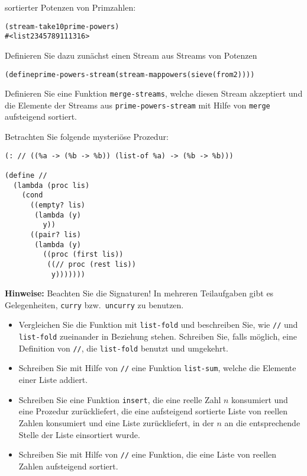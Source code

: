 \begin{aufgabe}
\begin{enumerate}
     sortierter Potenzen von Primzahlen:
     \begin{alltt}
(stream-take 10 prime-powers)
\evalsto{} #<list 2 3 4 5 7 8 9 11 13 16>
     \end{alltt}
     Definieren Sie dazu zunächst einen Stream aus Streams von Potenzen
     \begin{alltt}
(define prime-powers-stream (stream-map powers (sieve (from 2))))
     \end{alltt}
     Definieren Sie eine Funktion \texttt{merge-streams}, welche
     diesen Stream akzeptiert und die Elemente der Streams
     aus \texttt{prime-powers-stream} mit Hilfe von \texttt{merge}
     aufsteigend sortiert.
   \end{enumerate}
 \end{aufgabe}

 \begin{aufgabe}
  Betrachten Sie folgende mysteriöse Prozedur:
\begin{verbatim}
(: // ((%a -> (%b -> %b)) (list-of %a) -> (%b -> %b)))

(define //
  (lambda (proc lis)
    (cond
      ((empty? lis)
       (lambda (y)
         y))
      ((pair? lis)
       (lambda (y)
         ((proc (first lis))
          ((// proc (rest lis))
           y)))))))
\end{verbatim}
  \textbf{Hinweise:} Beachten Sie die Signaturen! In mehreren
  Teilaufgaben gibt es Gelegenheiten, \texttt{curry} bzw.\
  \texttt{uncurry} zu benutzen.

  \begin{itemize}
  \item Vergleichen Sie die Funktion mit \texttt{list-fold} und
    beschreiben Sie, wie \texttt{//} und \texttt{list-fold} zueinander
    in Beziehung stehen.  Schreiben Sie, falls möglich, eine
    Definition von \texttt{//}, die \texttt{list-fold} benutzt und
    umgekehrt.
  \item Schreiben Sie mit Hilfe von \texttt{//} eine Funktion
    \texttt{list-sum}, welche die Elemente einer Liste addiert.
  \item Schreiben Sie eine Funktion \texttt{insert}, die eine reelle
    Zahl $n$ konsumiert und eine Prozedur zurückliefert, die eine
    aufsteigend sortierte Liste von reellen Zahlen konsumiert und
    eine Liste zurückliefert, in der $n$ an die entsprechende
    Stelle der Liste einsortiert wurde.
  \item Schreiben Sie mit Hilfe von \texttt{//} eine Funktion, die
    eine Liste von reellen Zahlen aufsteigend sortiert.
  \end{itemize}
\end{aufgabe}

